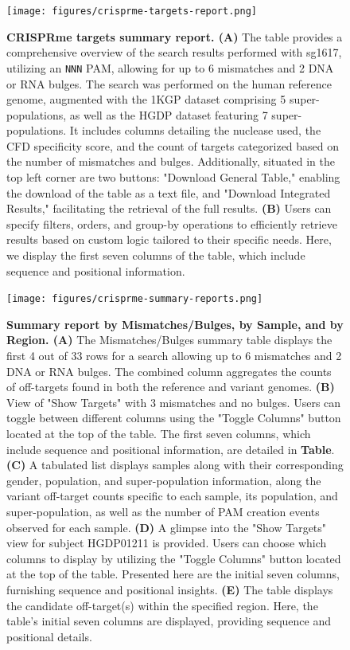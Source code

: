 \documentclass[a4paper, titlepage, openright]{book}
\newcommand{\crisprme}{CRISPRme\xspace}
\begin{document}
\begin{figure}[!]
    \centering
    \texttt{[image: figures/crisprme-targets-report.png]}
    \caption[\crisprme targets summary report]{\textbf{\crisprme targets summary report. (A)} The table provides a comprehensive overview of the search results performed with sg1617, utilizing an \texttt{NNN} PAM, allowing for up to 6 mismatches and 2 DNA or RNA bulges. The search was performed on the human reference genome, augmented with the 1KGP dataset comprising 5 super-populations, as well as the HGDP dataset featuring 7 super-populations. It includes columns detailing the nuclease used, the CFD specificity score, and the count of targets categorized based on the number of mismatches and bulges. Additionally, situated in the top left corner are two buttons: "Download General Table," enabling the download of the table as a text file, and "Download Integrated Results," facilitating the retrieval of the full results. \textbf{(B)} Users can specify filters, orders, and group-by operations to efficiently retrieve results based on custom logic tailored to their specific needs. Here, we display the first seven columns of the table, which include sequence and positional information.}
    \label{fig:crisprme-targets-report}
\end{figure}

\begin{figure}[!]
    \centering
    \texttt{[image: figures/crisprme-summary-reports.png]}
    \caption[Summary report by Mismatches/Bulges, by Sample, and by Region]{\textbf{Summary report by Mismatches/Bulges, by Sample, and by Region. (A)} The Mismatches/Bulges summary table displays the first 4 out of 33 rows for a search allowing up to 6 mismatches and 2 DNA or RNA bulges. The combined column aggregates the counts of off-targets found in both the reference and variant genomes. \textbf{(B)} View of "Show Targets" with 3 mismatches and no bulges. Users can toggle between different columns using the "Toggle Columns" button located at the top of the table. The first seven columns, which include sequence and positional information, are detailed in \textbf{Table}. \textbf{(C)} A tabulated list displays samples along with their corresponding gender, population, and super-population information, along the variant off-target counts specific to each sample, its population, and super-population, as well as the number of PAM creation events observed for each sample. \textbf{(D)} A glimpse into the "Show Targets" view for subject HGDP01211 is provided. Users can choose which columns to display by utilizing the "Toggle Columns" button located at the top of the table. Presented here are the initial seven columns, furnishing sequence and positional insights. \textbf{(E)} The table displays the candidate off-target(s) within the specified region. Here, the table's initial seven columns are displayed, providing sequence and positional details.}
    \label{fig:crisprme-summary-reports}
\end{figure}
\end{document}

